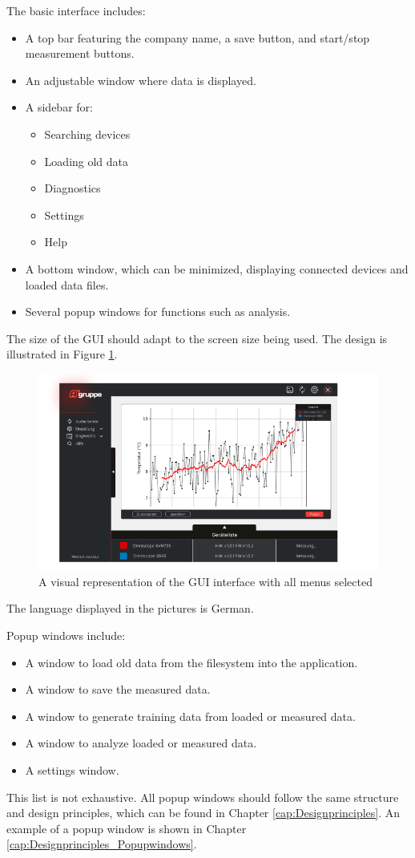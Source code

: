 \documentclass[]{scrreprt}
\begin{document}
The basic interface includes:
\begin{itemize}
\item A top bar featuring the company name, a save button, and start/stop measurement buttons.
\item An adjustable window where data is displayed.
\item A sidebar for:
    \begin{itemize}
    \item Searching devices
    \item Loading old data
    \item Diagnostics
    \item Settings
    \item Help
    \end{itemize}
\item A bottom window, which can be minimized, displaying connected devices and loaded data files.
\item Several popup windows for functions such as analysis.
\end{itemize}

The size of the GUI should adapt to the screen size being used. The design is illustrated in Figure \ref{fig:GUI}.

\begin{figure}[!h]
\includegraphics[width=.9\textwidth]{./assets/pictures/DatawindowVersion1.0.png}
\caption[]{A visual representation of the GUI interface with all menus selected}
\label{fig:GUI}
\end{figure}

The language displayed in the pictures is German.

Popup windows include:
\begin{itemize}
\item A window to load old data from the filesystem into the application.
\item A window to save the measured data.
\item A window to generate training data from loaded or measured data.
\item A window to analyze loaded or measured data.
\item A settings window.
\end{itemize}
This list is not exhaustive.
 All popup windows should follow the same structure and design principles, which can be found in Chapter \ref{cap:Designprinciples}. 
 An example of a popup window is shown in Chapter \ref{cap:Designprinciples_Popupwindows}.
\end{document}
